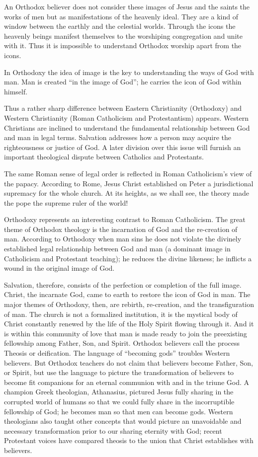 An Orthodox believer does not consider these images of Jesus and the saints the works of men but as
manifestations of the heavenly ideal. They are a kind of window between the earthly and the
celestial worlds. Through the icons the heavenly beings manifest themselves to the worshiping
congregation and unite with it. Thus it is impossible to understand Orthodox worship apart from the
icons.

In Orthodoxy the idea of image is the key to understanding the ways of God with man. Man is created
“in the image of God”; he carries the icon of God within himself.

Thus a rather sharp difference between Eastern Christianity (Orthodoxy) and Western Christianity
(Roman Catholicism and Protestantism) appears. Western Christians are inclined to understand the
fundamental relationship between God and man in legal terms. Salvation addresses how a person may
acquire the righteousness or justice of God. A later division over this issue will furnish an
important theological dispute between Catholics and Protestants.

The same Roman sense of legal order is reflected in Roman Catholicism’s view of the papacy.
According to Rome, Jesus Christ established on Peter a jurisdictional supremacy for the whole
church. At its heights, as we shall see, the theory made the pope the supreme ruler of the world!

Orthodoxy represents an interesting contrast to Roman Catholicism. The great theme of Orthodox
theology is the incarnation of God and the re-creation of man. According to Orthodoxy when man sins
he does not violate the divinely established legal relationship between God and man (a dominant
image in Catholicism and Protestant teaching); he reduces the divine likeness; he inflicts a wound
in the original image of God.

Salvation, therefore, consists of the perfection or completion of the full image. Christ, the
incarnate God, came to earth to restore the icon of God in man. The major themes of Orthodoxy, then,
are rebirth, re-creation, and the transfiguration of man. The church is not a formalized
institution, it is the mystical body of Christ constantly renewed by the life of the Holy Spirit
flowing through it. And it is within this community of love that man is made ready to join the
preexisting fellowship among Father, Son, and Spirit. Orthodox believers call the process Theosis or
deification. The language of “becoming gods” troubles Western believers. But Orthodox teachers do
not claim that believers become Father, Son, or Spirit, but use the language to picture the
transformation of believers to become fit companions for an eternal communion with and in the triune
God. A champion Greek theologian, Athanasius, pictured Jesus fully sharing in the corrupted world of
humans so that we could fully share in the incorruptible fellowship of God; he becomes man so that
men can become gods. Western theologians also taught other concepts that would picture an
unavoidable and necessary transformation prior to our sharing eternity with God; recent Protestant
voices have compared theosis to the union that Christ establishes with believers.

